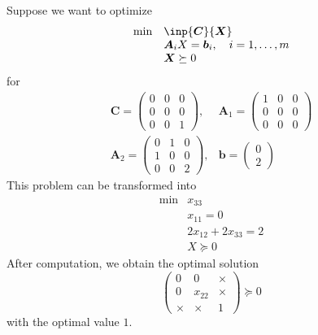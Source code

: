 \begin{example}
Suppose we want to optimize
\begin{equation}
\begin{array}{ll}
\min&\inp{\bm C}{\bm X}\\
&\bm{A}_i{X}=\bm b_i,\quad i=1,\dots,m\\
&\bm X\succeq0
\end{array}
\end{equation}
for
\[
\begin{array}{ll}
\bm C=\begin{pmatrix}
0&0&0\\0&0&0\\0&0&1
\end{pmatrix},
&
\bm A_1=\begin{pmatrix}
1&0&0\\0&0&0\\0&0&0
\end{pmatrix}\\
\bm A_2=\begin{pmatrix}
0&1&0\\1&0&0\\0&0&2
\end{pmatrix},
&
\bm b=\begin{pmatrix}
0\\2
\end{pmatrix}
\end{array}
\]
This problem can be transformed into
\begin{equation}
\begin{array}{ll}
\min&x_{33}\\
&x_{11}=0\\
&2x_{12}+2x_{33}=2\\
&X\succeq0
\end{array}
\end{equation}
After computation, we obtain the optimal solution
\[
\begin{pmatrix}
0&0&\times\\0&x_{22}&\times\\\times&\times&1
\end{pmatrix}\succeq0
\]
with the optimal value $1$.


\end{example}
